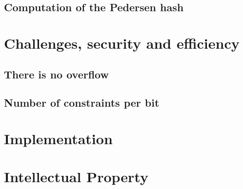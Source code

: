\documentclass[11pt]{article}
\begin{document}
		\subsection{Computation of the Pedersen hash}					
		\label{sec-computation}
		\subsection{}
		
	\section{Challenges, security and efficiency}

	
		\subsection{There is no overflow}	 						
		\subsection{Number of constraints per bit  }
																			
			
	\section{Implementation}										
	
	\section {Intellectual Property }					

	
		

\end{document}
